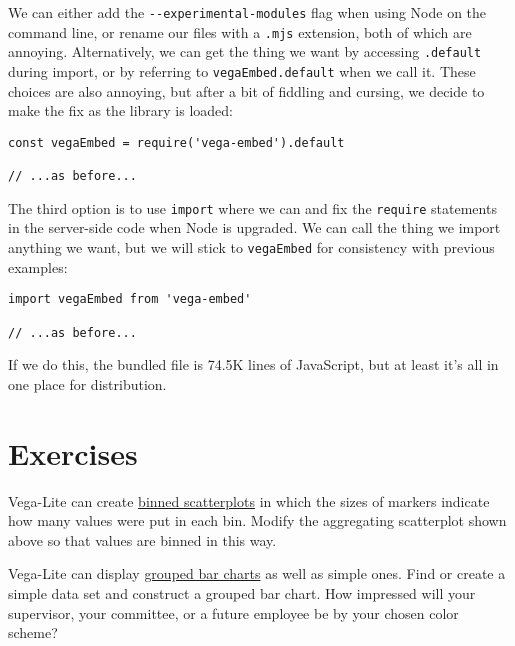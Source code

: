 We can either add the \texttt{-\/-experimental-modules} flag when using Node on the command line,
or rename our files with a \texttt{.mjs} extension,
both of which are annoying.
Alternatively,
we can get the thing we want by accessing \texttt{.default} during import,
or by referring to \texttt{vegaEmbed.default} when we call it.
These choices are also annoying,
but after a bit of fiddling and cursing,
we decide to make the fix as the library is loaded:

\begin{verbatim}
const vegaEmbed = require('vega-embed').default

// ...as before...
\end{verbatim}

The third option is to use \texttt{import} where we can
and fix the \texttt{require} statements in the server-side code when Node is upgraded.
We can call the thing we import anything we want,
but we will stick to \texttt{vegaEmbed} for consistency with previous examples:

\begin{verbatim}
import vegaEmbed from 'vega-embed'

// ...as before...
\end{verbatim}

If we do this,
the bundled file is 74.5K lines of JavaScript,
but at least it's all in one place for distribution.

\section{Exercises}\label{s:vis-exercises}


Vega-Lite can create
\href{https://vega.github.io/vega-lite/examples/circle_binned.html}{binned scatterplots}
in which the sizes of markers indicate how many values were put in each bin.
Modify the aggregating scatterplot shown above
so that values are binned in this way.


Vega-Lite can display
\href{https://vega.github.io/vega-lite/examples/bar_grouped.html}{grouped bar charts}
as well as simple ones.
Find or create a simple data set and construct a grouped bar chart.
How impressed will your supervisor, your committee, or a future employee be
by your chosen color scheme?


